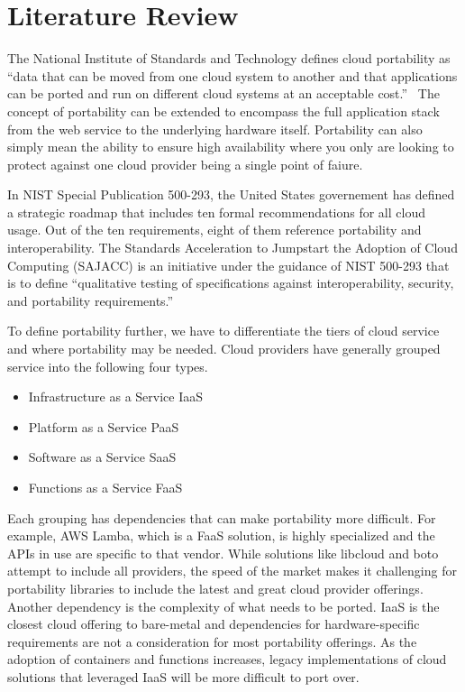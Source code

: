 \section{Literature Review}

The National Institute of Standards and Technology defines cloud  portability as ``data 
that can be moved from one cloud system to another and that  applications can be ported 
and run on different  cloud systems at an  acceptable cost.''~\cite{hid-sp18-518-NIST-291} 
The concept of portability can be extended to encompass the full application stack from
the web service to the underlying hardware itself. Portability can also simply mean the 
ability to ensure high availability where you only are looking to protect against one 
cloud provider being a single point of faiure.

In NIST Special Publication 500-293, the United States governement has
defined a strategic roadmap that includes ten formal recommendations
for all cloud usage. Out of the ten requirements, eight of them
reference portability and interoperability. The Standards Acceleration
to Jumpstart the Adoption of Cloud Computing (SAJACC) is an initiative
under the guidance of NIST 500-293 that is to define ``qualitative
testing of specifications against interoperability, security, and
portability requirements.''~\cite{hid-sp18-518-NIST-293}

To define portability further, we have to differentiate the tiers of cloud service and 
where portability may be needed. Cloud providers have generally grouped service into the
following four types.

\begin{itemize}
\item
  Infrastructure as a Service \- IaaS
\item
  Platform as a Service \- PaaS
\item
  Software as a Service \- SaaS
\item
  Functions as a Service \- FaaS
\end{itemize}

Each grouping has dependencies that can make portability more difficult. For example, AWS
Lamba, which is a FaaS solution, is highly specialized and the APIs in use are specific to
that vendor. While solutions like libcloud and boto attempt to include all providers, the 
speed of the market makes it challenging for portability libraries to include the latest 
and great cloud provider offerings.~\cite{hid-sp18-518-LibCloud} Another dependency is 
the complexity of what needs to be ported. IaaS is the closest cloud offering to 
bare-metal and dependencies for hardware-specific requirements are not a consideration 
for most portability offerings. As the adoption of containers and functions increases, 
legacy implementations of cloud solutions that leveraged IaaS will be more difficult to 
port over. 

